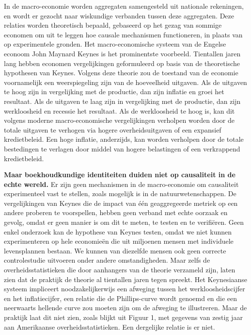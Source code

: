 In de macro-economie worden aggregaten samengesteld uit nationale rekeningen, en wordt er gezocht naar wiskundige verbanden tussen deze aggregaten. Deze relaties worden theoretisch bepaald, gebaseerd op het gezag van sommige economen om uit te leggen hoe causale mechanismen functioneren, in plaats van op experimentele gronden. Het macro-economische systeem van de Engelse econoom John Maynard Keynes is het prominentste voorbeeld. Tientallen jaren lang hebben economen vergelijkingen geformuleerd op basis van de theoretische hypothesen van Keynes. Volgens deze theorie zou de toestand van de economie voornamelijk een weerspiegeling zijn van de hoeveelheid uitgaven. Als de uitgaven te hoog zijn in vergelijking met de productie, dan zijn inflatie en groei het resultaat. Als de uitgaven te laag zijn in vergelijking met de productie, dan zijn werkloosheid en recessie het resultaat. Als de werkloosheid te hoog is, kan dit volgens moderne macro-economische vergelijkingen verholpen worden door de totale uitgaven te verhogen via hogere overheidsuitgaven of een expansief kredietbeleid. Een hoge inflatie, anderzijds, kan worden verholpen door de totale bestedingen te verlagen door middel van hogere belastingen of een verkrappend kredietbeleid.

\textbf{Maar boekhoudkundige identiteiten duiden niet op causaliteit in de echte wereld.} Er zijn geen mechanismen in de macro-economie om causaliteit experimenteel vast te stellen, zoals mogelijk is in de natuurwetenschappen. De vergelijkingen van Keynes die de impact van één geaggregeerde metriek op een andere proberen te voorspellen, hebben geen verband met echte oorzaak en gevolg, omdat er geen manier is om dit te meten, te testen en te verifiëren. Geen enkel onderzoek kan de hypothese van Keynes testen, omdat we niet kunnen experimenteren op hele economieën die uit miljoenen mensen met individuele levensplannen bestaan. We kunnen van diezelfde mensen ook geen correcte controlestudie uitvoeren onder andere omstandigheden. Maar zelfs de overheidsstatistieken die door aanhangers van de theorie verzameld zijn, laten zien dat de praktijk de theorie al tientallen jaren tegen spreekt. Het Keynesiaanse systeem impliceert noodzakelijkerwijs een afweging tussen het werkloosheidscijfer en het inflatiecijfer, een relatie die de Phillips-curve wordt genoemd en die een neerwaarts hellende curve zou moeten zijn om de afweging te illustreren. Maar de praktijk laat dit niet zien, zoals blijkt uit Figuur 1, met gegevens van zestig jaar aan Amerikaanse overheidsstatistieken. Een  dergelijke relatie is er niet.

